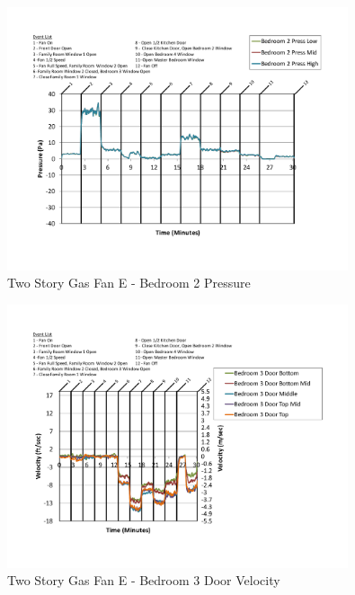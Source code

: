 \documentclass{article}
\begin{document}
\begin{appendices}
	\begin{figure}[H]
		\centering
		\includegraphics[height=3.05in,trim=0.67in 1.1in 0.67in 0.8in,clip=true]{0_Images/Results_Charts/ColdFlow/Two_Story/Gas/E/Bedroom_2_Pressure.pdf}
		\caption{Two Story Gas Fan E - Bedroom 2 Pressure}
	\end{figure}
 

	\begin{figure}[H]
		\centering
		\includegraphics[height=3.05in,trim=0.67in 1.1in 0.67in 0.8in,clip=true]{0_Images/Results_Charts/ColdFlow/Two_Story/Gas/E/Bedroom_3_Door_Velocity.pdf}
		\caption{Two Story Gas Fan E - Bedroom 3 Door Velocity}
	\end{figure}
 
	\clearpage


\end{appendices}
\end{document}
